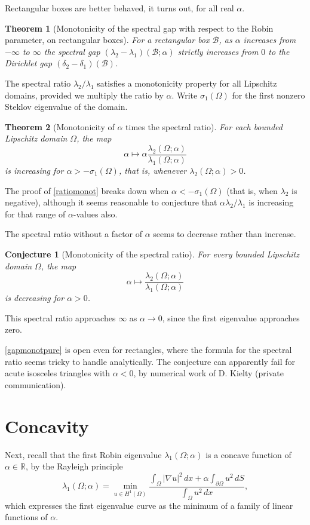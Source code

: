 \documentclass[12pt,reqno]{amsart}
\newtheorem{theorem}{Theorem}[section]
\newtheorem{conjx}{Conjecture}
\theoremstyle{definition}
\newcommand{\R}{{\mathbb R}}
\begin{document}
Rectangular boxes are better behaved, it turns out, for all real $\alpha$. 
%
\begin{theorem}[Monotonicity of the spectral gap with respect to the Robin parameter, on rectangular boxes] \label{gapmonot}
For a rectangular box $\mathcal{B}$, as $\alpha$ increases from $-\infty$ to $\infty$ the spectral gap $(\lambda_2-\lambda_1)(\mathcal{B};\alpha)$ strictly increases from $0$ to the Dirichlet gap $(\delta_2-\delta_1)(\mathcal{B})$. 
\end{theorem}
%

The spectral ratio $\lambda_2/\lambda_1$ satisfies a monotonicity property for all Lipschitz domains,  provided we multiply the ratio by $\alpha$. Write $\sigma_1(\Omega)$ for the first nonzero Steklov eigenvalue of the domain. 
%
\begin{theorem}[Monotonicity of $\alpha$ times the spectral ratio] \label{ratiomonot}
For each bounded Lipschitz domain $\Omega$, the map 
\[
\alpha \mapsto \alpha \frac{\lambda_2(\Omega;\alpha)}{\lambda_1(\Omega;\alpha)}
\]
is increasing for $\alpha > -\sigma_1(\Omega)$, that is, whenever $\lambda_2(\Omega;\alpha)>0$. 
\end{theorem}
%
The proof of \autoref{ratiomonot} breaks down when $\alpha < -\sigma_1(\Omega)$ (that is, when $\lambda_2$ is negative), although it seems reasonable to conjecture that $\alpha \lambda_2/\lambda_1$ is increasing for that range of $\alpha$-values also. 

The spectral ratio without a factor of $\alpha$ seems to decrease rather than increase. 
%
\begin{conjx}[Monotonicity of the spectral ratio] \label{gapmonotpure}
For every bounded Lipschitz domain $\Omega$, the map
\[
\alpha \mapsto \frac{\lambda_2(\Omega;\alpha)}{\lambda_1(\Omega;\alpha)}
\]
is decreasing for $\alpha>0$.  
\end{conjx}
%
This spectral ratio approaches $\infty$ as $\alpha \to 0$, since the first eigenvalue approaches zero. 

\autoref{gapmonotpure} is open even for rectangles, where the formula for the spectral ratio seems tricky to handle analytically. The conjecture can apparently fail for acute isosceles triangles with $\alpha<0$, by numerical work of D. Kielty (private communication). 

\section*{Concavity} Next, recall that the first Robin eigenvalue $\lambda_1(\Omega;\alpha)$ is a concave function of $\alpha \in \R$, by the Rayleigh principle 
\[
\lambda_1(\Omega;\alpha) = \min_{u \in H^1(\Omega)} \frac{\int_\Omega |\nabla u|^2 \, dx + \alpha \int_{\partial \Omega} u^2 \, dS}{\int_\Omega u^2 \, dx} ,
\]
which expresses the first eigenvalue curve as the minimum of a family of linear functions of $\alpha$. 
\end{document}
